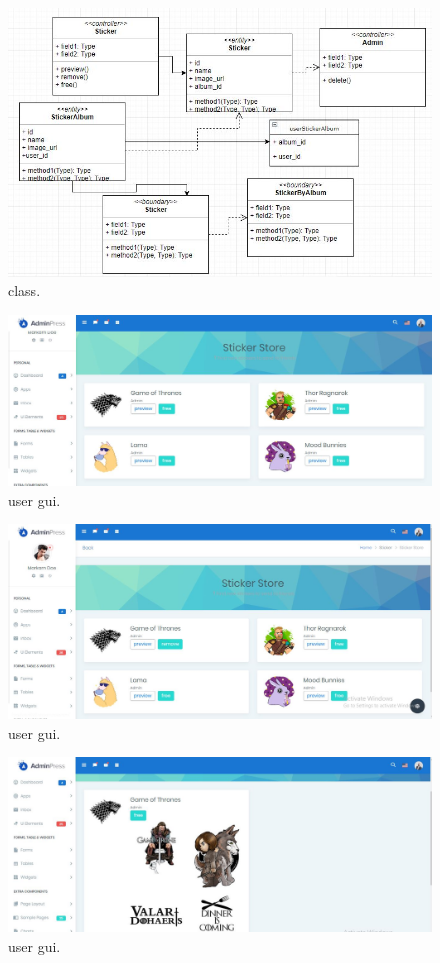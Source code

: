 \documentclass[12pt]{article}
\begin{document}
	\begin{figure}
	\includegraphics[width=\linewidth]{class.jpg}
	\caption{class.}
	\label{fig:erd}
\end{figure}
		\begin{figure}
		\includegraphics[width=\linewidth]{gui1.jpg}
		\caption{user gui.}
		\label{fig:erd}
	\end{figure}
	\begin{figure}
	\includegraphics[width=\linewidth]{usergui.jpg}
	\caption{user gui.}
	\label{fig:erd}
\end{figure}
	\begin{figure}
	\includegraphics[width=\linewidth]{gui2.jpg}
	\caption{user gui.}
	\label{fig:erd}
	\end{figure}
\end{document}
